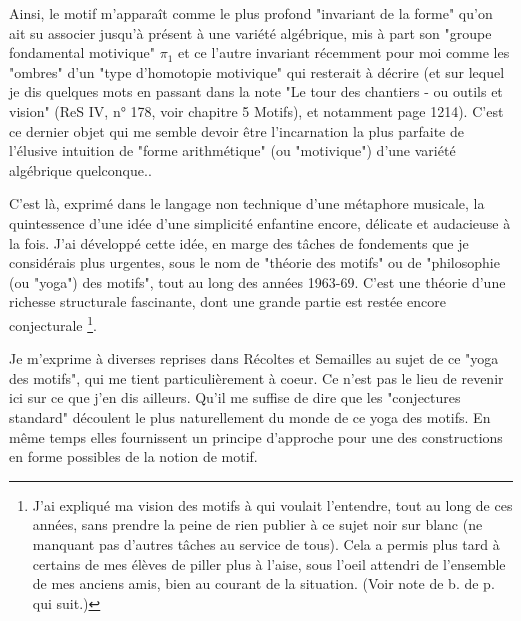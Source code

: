 {Ainsi, le motif m'apparaît comme le plus profond "invariant de la forme" qu'on ait su associer jusqu'à présent à une variété algébrique, mis à part son "groupe fondamental motivique" $\pi_1$ et ce l'autre invariant récemment pour moi comme les "ombres" d'un "type d'homotopie motivique" qui resterait à décrire (et sur lequel je dis quelques mots en passant dans la note "Le tour des chantiers - ou outils et vision" (ReS IV, n° 178, voir chapitre 5 Motifs), et notamment page 1214). C'est ce dernier objet qui me semble devoir être l'incarnation la plus parfaite de l'élusive intuition de "forme arithmétique" (ou "motivique") d'une variété algébrique quelconque.}.

C'est là, exprimé dans le langage non technique d'une métaphore musicale, la quintessence d'une idée d'une simplicité enfantine encore, délicate et audacieuse à la fois. J'ai développé cette idée, en marge des tâches de fondements que je considérais plus urgentes, sous le nom de "théorie des motifs" ou de "philosophie (ou "yoga") des motifs", tout au long des années 1963-69. C'est une théorie d'une richesse structurale fascinante, dont une grande partie est restée encore conjecturale \footnote{J'ai expliqué ma vision des motifs à qui voulait l'entendre, tout au long de ces années, sans prendre la peine de rien publier à ce sujet noir sur blanc (ne manquant pas d'autres tâches au service de tous). Cela a permis plus tard à certains de mes élèves de piller plus à l'aise, sous l'oeil attendri de l'ensemble de mes anciens amis, bien au courant de la situation. (Voir note de b. de p. qui suit.)}.

Je m'exprime à diverses reprises dans Récoltes et Semailles au sujet de ce "yoga des motifs", qui me tient particulièrement à coeur. Ce n'est pas le lieu de revenir ici sur ce que j'en dis ailleurs. Qu'il me suffise de dire que les "conjectures standard" découlent le plus naturellement du monde de ce yoga des motifs. En même temps elles fournissent un principe d'approche pour une des constructions en forme possibles de la notion de motif.

